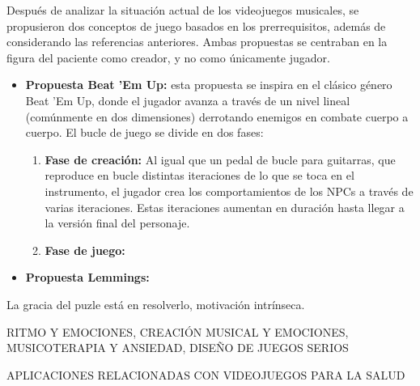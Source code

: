 Después de analizar la situación actual de los videojuegos musicales, se propusieron dos conceptos de juego basados en los prerrequisitos, además de considerando las referencias anteriores. Ambas propuestas se centraban en la figura del paciente como creador, y no como únicamente jugador.

\begin{itemize}
	\item \textbf{Propuesta Beat 'Em Up:} esta propuesta se inspira en el clásico género Beat 'Em Up, donde el jugador avanza a través de un nivel lineal (comúnmente en dos dimensiones) derrotando enemigos en combate cuerpo a cuerpo. El bucle de juego se divide en dos fases:
	\begin{enumerate}
		\item \textbf{Fase de creación:} Al igual que un pedal de bucle para guitarras, que reproduce en bucle distintas iteraciones de lo que se toca en el instrumento, el jugador crea los comportamientos de los NPCs a través de varias iteraciones. Estas iteraciones aumentan en duración hasta llegar a la versión final del personaje.
		\item \textbf{Fase de juego:} 
	\end{enumerate}
	\item \textbf{Propuesta Lemmings:} 
\end{itemize}

La gracia del puzle está en resolverlo, motivación intrínseca.

RITMO Y EMOCIONES,
CREACIÓN MUSICAL Y EMOCIONES,
MUSICOTERAPIA Y ANSIEDAD,
DISEÑO DE JUEGOS SERIOS

APLICACIONES RELACIONADAS CON VIDEOJUEGOS PARA LA SALUD
